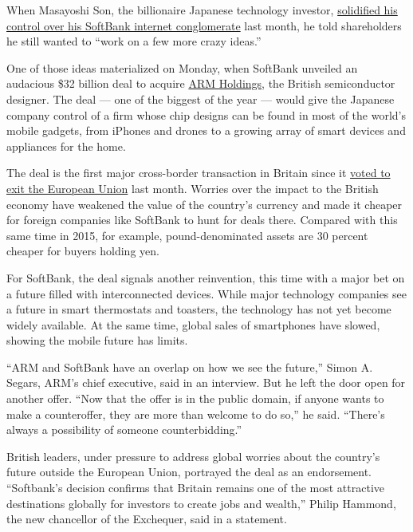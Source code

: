 When Masayoshi Son, the billionaire Japanese technology investor,
\href{http://www.nytimes.com/2016/06/22/business/dealbook/a-departure-leaves-softbanks-founder-firmly-in-charge.html}{solidified
his control over his SoftBank internet conglomerate} last month, he told
shareholders he still wanted to ``work on a few more crazy ideas.''

One of those ideas materialized on Monday, when SoftBank unveiled an
audacious \$32 billion deal to acquire \href{https://www.arm.com/}{ARM
Holdings}, the British semiconductor designer. The deal --- one of the
biggest of the year --- would give the Japanese company control of a
firm whose chip designs can be found in most of the world's mobile
gadgets, from iPhones and drones to a growing array of smart devices and
appliances for the home.

The deal is the first major cross-border transaction in Britain since it
\href{http://www.nytimes.com/news-event/britain-brexit-european-union}{voted
to exit the European Union} last month. Worries over the impact to the
British economy have weakened the value of the country's currency and
made it cheaper for foreign companies like SoftBank to hunt for deals
there. Compared with this same time in 2015, for example,
pound-denominated assets are 30 percent cheaper for buyers holding yen.

For SoftBank, the deal signals another reinvention, this time with a
major bet on a future filled with interconnected devices. While major
technology companies see a future in smart thermostats and toasters, the
technology has not yet become widely available. At the same time, global
sales of smartphones have slowed, showing the mobile future has limits.

``ARM and SoftBank have an overlap on how we see the future,'' Simon A.
Segars, ARM's chief executive, said in an interview. But he left the
door open for another offer. ``Now that the offer is in the public
domain, if anyone wants to make a counteroffer, they are more than
welcome to do so,'' he said. ``There's always a possibility of someone
counterbidding.''

British leaders, under pressure to address global worries about the
country's future outside the European Union, portrayed the deal as an
endorsement. ``Softbank's decision confirms that Britain remains one of
the most attractive destinations globally for investors to create jobs
and wealth,'' Philip Hammond, the new chancellor of the Exchequer, said
in a statement.

